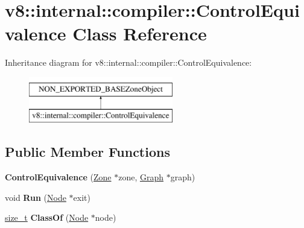 \hypertarget{classv8_1_1internal_1_1compiler_1_1ControlEquivalence}{}\section{v8\+:\+:internal\+:\+:compiler\+:\+:Control\+Equivalence Class Reference}
\label{classv8_1_1internal_1_1compiler_1_1ControlEquivalence}
Inheritance diagram for v8\+:\+:internal\+:\+:compiler\+:\+:Control\+Equivalence\+:\begin{figure}[H]
\begin{center}
\leavevmode
\includegraphics[height=2.000000cm]{classv8_1_1internal_1_1compiler_1_1ControlEquivalence}
\end{center}
\end{figure}
\subsection*{Public Member Functions}
\begin{DoxyCompactItemize}
\item 
\mbox{\label{classv8_1_1internal_1_1compiler_1_1ControlEquivalence_af0f69b9c53c3f253242dc4351e69cec5}} 
{\bfseries Control\+Equivalence} (\mbox{\hyperlink{classv8_1_1internal_1_1Zone}{Zone}} $\ast$zone, \mbox{\hyperlink{classv8_1_1internal_1_1compiler_1_1Graph}{Graph}} $\ast$graph)
\item 
\mbox{\label{classv8_1_1internal_1_1compiler_1_1ControlEquivalence_a5da4c349657b79aefe10dba6f017202c}} 
void {\bfseries Run} (\mbox{\hyperlink{classv8_1_1internal_1_1compiler_1_1Node}{Node}} $\ast$exit)
\item 
\mbox{\label{classv8_1_1internal_1_1compiler_1_1ControlEquivalence_a04038df9e9be6b8e4c85314f3508ed2b}} 
\mbox{\hyperlink{classsize__t}{size\+\_\+t}} {\bfseries Class\+Of} (\mbox{\hyperlink{classv8_1_1internal_1_1compiler_1_1Node}{Node}} $\ast$node)
\end{DoxyCompactItemize}


